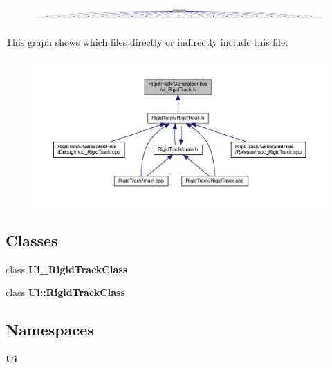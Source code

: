\begin{figure}[H]
\begin{center}
\leavevmode
\includegraphics[width=350pt]{ui___rigid_track_8h__incl}
\end{center}
\end{figure}
This graph shows which files directly or indirectly include this file\+:\nopagebreak
\begin{figure}[H]
\begin{center}
\leavevmode
\includegraphics[width=350pt]{ui___rigid_track_8h__dep__incl}
\end{center}
\end{figure}
\subsection*{Classes}
\begin{DoxyCompactItemize}
\item 
class \textbf{ Ui\+\_\+\+Rigid\+Track\+Class}
\item 
class \textbf{ Ui\+::\+Rigid\+Track\+Class}
\end{DoxyCompactItemize}
\subsection*{Namespaces}
\begin{DoxyCompactItemize}
\item 
 \textbf{ Ui}
\end{DoxyCompactItemize}
